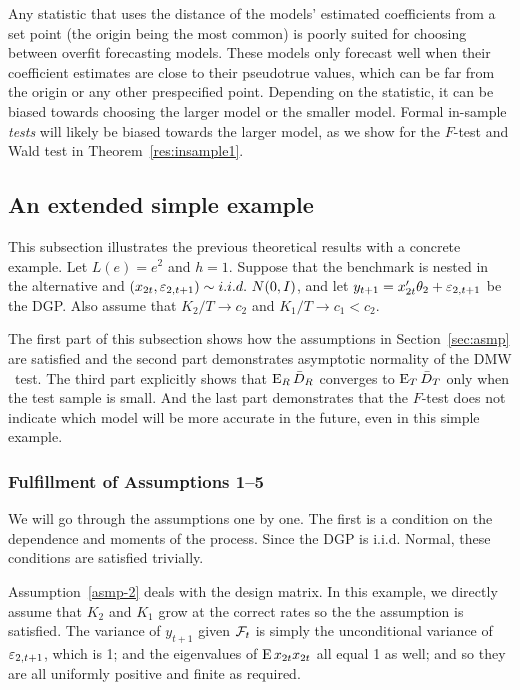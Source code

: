 \documentclass[12pt,draft]{article}
\begin{document}
Any statistic that uses the distance of the models' estimated
coefficients from a set point (the origin being the most common) is
poorly suited for choosing between overfit forecasting models. These
models only forecast well when their coefficient estimates are close
to their pseudotrue values, which can be far from the origin or any
other prespecified
point. Depending on the statistic, it can be biased towards choosing
the larger model or the smaller model. Formal in-sample \emph{tests}
will likely be biased towards the larger model, as we show for the
$F$-test and Wald test in Theorem~\ref{res:insample1}.

\subsection{An extended simple example}
\label{sec:example}

This subsection illustrates the previous theoretical results with a
concrete example. Let $L(e) = e^2$ and $h = 1$. Suppose that the benchmark is
nested in the alternative and $(x_{2t}, \varepsilon_{2,t+1}) \sim i.i.d.\
N(0,I)$, and let $y_{t+1} = x_{2t}'\theta_2 + \varepsilon_{2,t+1}$
be the DGP. Also assume that $K_2/T \to c_2$ and $K_1 / T \to c_1 <
c_2$.

The first part of this subsection shows how the assumptions in
Section~\ref{sec:asmp} are satisfied and the second part
demonstrates asymptotic normality of the DMW \oost\ test. The third
part explicitly shows that $\operatorname{E}_R \bar{D}_{R}$ converges to $\operatorname{E}_T \bar{D}_{T}$ only
when the test sample is small. And the last part demonstrates that the
$F$-test does not indicate which model will be more
accurate in the future, even in this simple example.

\subsubsection*{Fulfillment of Assumptions 1--5}

We will go through the assumptions one by one. The first is
a condition on the dependence and moments of the process. Since the
DGP is i.i.d. Normal, these conditions are satisfied trivially.

Assumption~\ref{asmp-2} deals with the design matrix. In this example,
we directly assume that $K_2$ and $K_1$ grow at the correct rates so
the the assumption is satisfied. The variance of $y_{t+1}$ given
$\mathcal{F}_t$ is simply the unconditional variance of $\varepsilon_{2,t+1}$, which is
1; and the eigenvalues of $\operatorname{E} x_{2t} x_{2t}$ all equal 1 as well; and
so they are all uniformly positive and finite as required.
\end{document}
